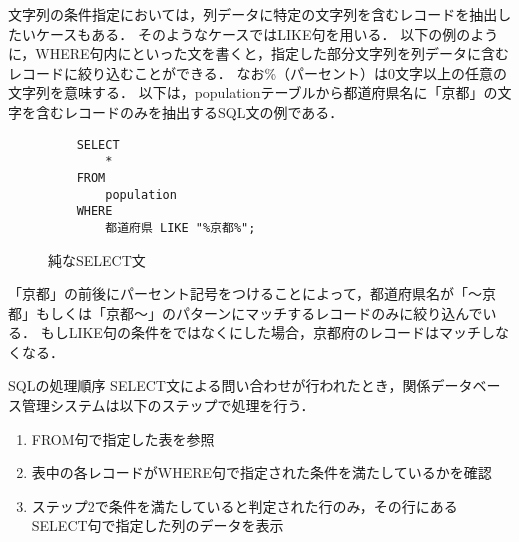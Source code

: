 文字列の条件指定においては，列データに特定の文字列を含むレコードを抽出したいケースもある．
そのようなケースではLIKE句を用いる．
以下の例のように，WHERE句内にといった文を書くと，指定した部分文字列を列データに含むレコードに絞り込むことができる．
なお\%（パーセント）は0文字以上の任意の文字列を意味する．
以下は，populationテーブルから都道府県名に「京都」の文字を含むレコードのみを抽出するSQL文の例である．
\begin{figure}[tb]
    \begin{verbatim}
    SELECT
        *
    FROM
        population
    WHERE
        都道府県 LIKE "%京都%";
    \end{verbatim}
    \captionsetup{name=コード}
    \caption{純なSELECT文}
    \label{code:sql-where3}
\end{figure}
\begin{table}[tb]
    \centering
    \caption{}
    \label{tb:}
\end{table}
「京都」の前後にパーセント記号をつけることによって，都道府県名が「〜京都」もしくは「京都〜」のパターンにマッチするレコードのみに絞り込んでいる．
もしLIKE句の条件をではなくにした場合，京都府のレコードはマッチしなくなる．

\begin{notebox}{SQLの処理順序}
    SELECT文による問い合わせが行われたとき，関係データベース管理システムは以下のステップで処理を行う．
    \begin{enumerate}
    \item FROM句で指定した表を参照
    \item 表中の各レコードがWHERE句で指定された条件を満たしているかを確認
    \item ステップ2で条件を満たしていると判定された行のみ，その行にあるSELECT句で指定した列のデータを表示
    \end{enumerate}
\end{notebox}

